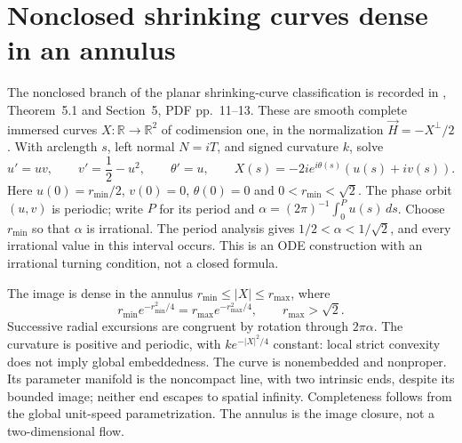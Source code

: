 \chapter{Nonclosed shrinking curves dense in an annulus}\label{sec:catalogue-halldorsson-dense-shrinkers}
\begin{example}\label{ex:catalogue-halldorsson-dense-shrinkers}
The nonclosed branch of the planar shrinking-curve classification is recorded in
\cite{CatHalldorsson2012}, Theorem~5.1 and Section~5, PDF pp.~11--13.
These are smooth complete immersed curves $X:\mathbb R\to\mathbb R^2$ of
codimension one, in the normalization $\vec H=-X^\perp/2$.
With arclength $s$, left normal $N=iT$, and signed curvature $k$, solve
\[
 u'=uv,\qquad v'=\frac12-u^2,\qquad \theta'=u,\qquad
 X(s)=-2i e^{i\theta(s)}(u(s)+iv(s)).
\]
Here $u(0)=r_{\min}/2$, $v(0)=0$, $\theta(0)=0$ and
$0<r_{\min}<\sqrt2$. The phase orbit $(u,v)$ is periodic; write $P$ for its
period and $\alpha=(2\pi)^{-1}\int_0^P u(s)\,ds$.
Choose $r_{\min}$ so that $\alpha$ is irrational. The period analysis gives
$1/2<\alpha<1/\sqrt2$, and every irrational value in this interval occurs.
This is an ODE construction with an irrational turning condition, not a closed formula.

The image is dense in the annulus $r_{\min}\leq |X|\leq r_{\max}$, where
\[
 r_{\min}e^{-r_{\min}^2/4}=r_{\max}e^{-r_{\max}^2/4},
 \qquad r_{\max}>\sqrt2.
\]
Successive radial excursions are congruent by rotation through $2\pi\alpha$.
The curvature is positive and periodic, with
$k e^{-|X|^2/4}$ constant: local strict convexity does not imply global embeddedness.
The curve is nonembedded and nonproper. Its parameter manifold is the
noncompact line, with two intrinsic ends, despite its bounded image; neither end
escapes to spatial infinity. Completeness follows from the global unit-speed
parametrization. The annulus is the image closure, not a two-dimensional flow.


\end{example}
